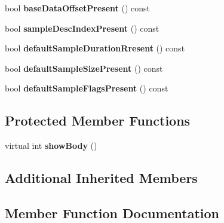\begin{DoxyCompactItemize}
\mbox{\label{classmp4_parser_1_1_tfhd_box_a663a9ca48ca6893b69ab71f20e4ff127}} 
bool {\bfseries base\+Data\+Offset\+Present} () const
\item 
\mbox{\label{classmp4_parser_1_1_tfhd_box_aa38771a258cc870035062ad420128232}} 
bool {\bfseries sample\+Desc\+Index\+Present} () const
\item 
\mbox{\label{classmp4_parser_1_1_tfhd_box_af4fd94993f2876d055d75d26f14d5def}} 
bool {\bfseries default\+Sample\+Duration\+Rresent} () const
\item 
\mbox{\label{classmp4_parser_1_1_tfhd_box_a9609d7255efda11192a2e9d3df761ef3}} 
bool {\bfseries default\+Sample\+Size\+Present} () const
\item 
\mbox{\label{classmp4_parser_1_1_tfhd_box_a2cbdcfea4aebc019de5256cadd3ed47c}} 
bool {\bfseries default\+Sample\+Flags\+Present} () const
\end{DoxyCompactItemize}
\subsection*{Protected Member Functions}
\begin{DoxyCompactItemize}
\item 
\mbox{\label{classmp4_parser_1_1_tfhd_box_a54350128dd08531665876e50e6ce3fa3}} 
virtual int {\bfseries show\+Body} ()
\end{DoxyCompactItemize}
\subsection*{Additional Inherited Members}


\subsection{Member Function Documentation}
\mbox{\label{classmp4_parser_1_1_tfhd_box_a9cbc2c42c59b678d13193fdb46a07314}} 
